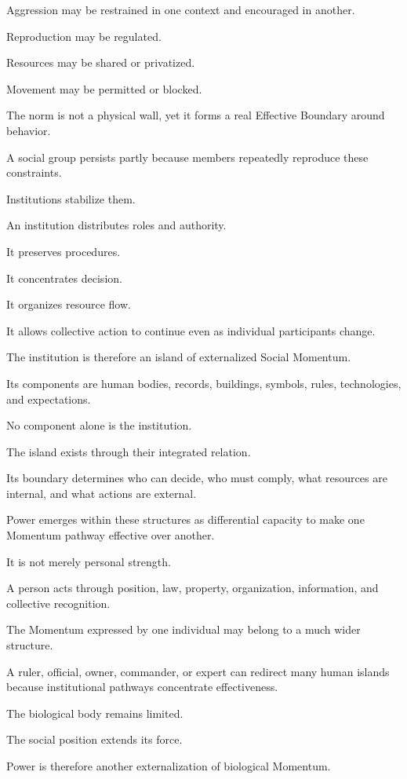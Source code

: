 Aggression may be restrained in one context and encouraged in another.

Reproduction may be regulated.

Resources may be shared or privatized.

Movement may be permitted or blocked.

The norm is not a physical wall, yet it forms a real Effective Boundary around behavior.

A social group persists partly because members repeatedly reproduce these constraints.

Institutions stabilize them.

An institution distributes roles and authority.

It preserves procedures.

It concentrates decision.

It organizes resource flow.

It allows collective action to continue even as individual participants change.

The institution is therefore an island of externalized Social Momentum.

Its components are human bodies, records, buildings, symbols, rules, technologies, and expectations.

No component alone is the institution.

The island exists through their integrated relation.

Its boundary determines who can decide, who must comply, what resources are internal, and what actions are external.

Power emerges within these structures as differential capacity to make one Momentum pathway effective over another.

It is not merely personal strength.

A person acts through position, law, property, organization, information, and collective recognition.

The Momentum expressed by one individual may belong to a much wider structure.

A ruler, official, owner, commander, or expert can redirect many human islands because institutional pathways concentrate effectiveness.

The biological body remains limited.

The social position extends its force.

Power is therefore another externalization of biological Momentum.

